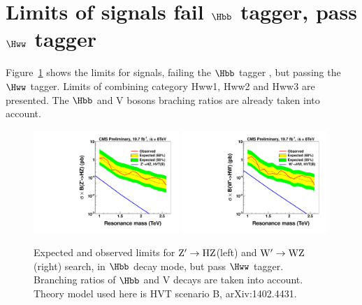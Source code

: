 \newpage
\section{Limits of \HbbVqq signals fail $\Hbb$ tagger, pass $\Hww$ tagger}
\label{results}


Figure~\ref{fig:HbbVHwwCombined} shows the limits for \HbbVqq signals, failing the $\Hbb$ tagger , but
 passing the
$\Hww$ tagger. Limits of combining category Hww1, Hww2 and Hww3 are presented.
The $\Hbb$ and V bosons braching ratios are already taken into account.


\begin{figure}[ht!pb]
\begin{center}
\includegraphics[width=0.49\textwidth]{brazilianFlag_HbbZqqHwwHPLPHV.pdf}
\includegraphics[width=0.49\textwidth]{brazilianFlag_HbbWqqHwwHPLPHV.pdf}
\end{center}
\caption{Expected and observed limits for ${\rm Z'\to HZ}$(left) and ${\rm W' \to WZ}$(right)
 search, in $\Hbb$ decay mode, but pass $\Hww$ tagger. Branching ratios of $\Hbb$ and V decays are
 taken into account. Theory model used here is HVT scenario B, arXiv:1402.4431.
}
\label{fig:HbbVHwwCombined}
\end{figure}




\clearpage
